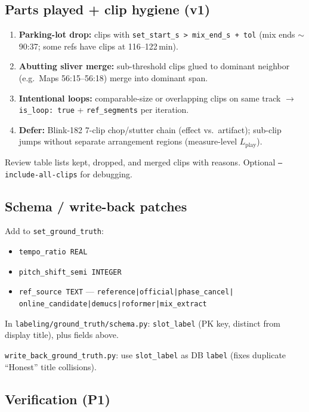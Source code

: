 \documentclass[11pt,a4paper]{article}
\begin{document}
\subsection{Parts played + clip hygiene (v1)}

\begin{enumerate}[noitemsep]
  \item \textbf{Parking-lot drop:} clips with \texttt{set\_start\_s > mix\_end\_s + tol}
        (mix ends ${\sim}$90:37; some refs have clips at 116--122\,min).
  \item \textbf{Abutting sliver merge:} sub-threshold clips glued to dominant neighbor
        (e.g.\ Maps 56:15--56:18) merge into dominant span.
  \item \textbf{Intentional loops:} comparable-size or overlapping clips on same track
        $\to$ \texttt{is\_loop: true} + \texttt{ref\_segments} per iteration.
  \item \textbf{Defer:} Blink-182 7-clip chop/stutter chain (effect vs.\ artifact);
        sub-clip jumps without separate arrangement regions (measure-level $L_{\mathrm{play}}$).
\end{enumerate}

Review table lists kept, dropped, and merged clips with reasons.
Optional \texttt{--include-all-clips} for debugging.

\subsection{Schema / write-back patches}

Add to \texttt{set\_ground\_truth}:
\begin{itemize}[noitemsep]
  \item \texttt{tempo\_ratio REAL}
  \item \texttt{pitch\_shift\_semi INTEGER}
  \item \texttt{ref\_source TEXT} --- \texttt{reference|official|phase\_cancel|
        online\_candidate|demucs|roformer|mix\_extract}
\end{itemize}

In \texttt{labeling/ground\_truth/schema.py}:
\texttt{slot\_label} (PK key, distinct from display title), plus fields above.

\texttt{write\_back\_ground\_truth.py}: use \texttt{slot\_label} as DB \texttt{label}
(fixes duplicate ``Honest'' title collisions).

\subsection{Verification (P1)}
\end{document}

